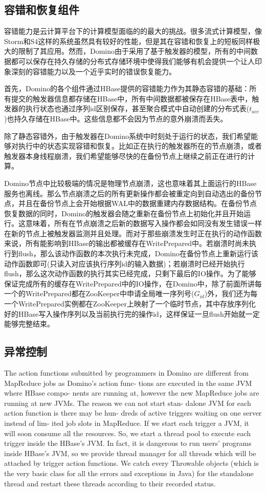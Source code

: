\subsection{容错和恢复组件}
容错能力是云计算平台下的计算模型面临的的最大的挑战。很多流式计算模型，像Storm和S4这样的系统虽然具有较好的性能，但是其在容错和恢复上的短板同样极大的限制了其应用。然而，Domino由于采用了基于触发器的模型，所有的中间数据都可以保存在持久存储的分布式存储环境中使得我们能够有机会提供一个让人印象深刻的容错能力以及一个近乎实时的错误恢复能力。

首先，Domino的各个组件通过HBase提供的容错能力作为其静态容错的基础：所有提交的触发器信息都存储在HBase中，所有中间数据都被保存在HBase表中，触发器的执行状态也通过序列id区别保存，甚至聚合模式中自动创建的分布式表($t_{acc}$)也持久存储在HBase中。这些信息都不会因为节点的意外崩溃而丢失。

除了静态容错外，由于触发器在Domino系统中时刻处于运行的状态，我们希望能够对执行中的状态实现容错和恢复。比如正在执行的触发器所在的节点崩溃，或者触发器本身线程崩溃，我们希望能够尽快的在备份节点上继续之前正在进行的计算。

Domino节点中比较极端的情况是物理节点崩溃，这也意味着其上面运行的HBase服务也离线。那么节点崩溃之后的所有更新操作都会被重定向到自动选出的备份节点，并且在备份节点上会开始根据WAL中的数据重建内存数据结构。在备份节点恢复数据的同时，Domino的触发器会随之重新在备份节点上初始化并且开始运行。这意味着，所有在节点崩溃之后新的数据写入操作都会如同没有发生错误一样在新的节点上被触发器监测并且处理。而对于那些崩溃发生时正在执行的动作函数来说，所有能影响到HBase的输出都被缓存在WritePrepared中。若崩溃时尚未执行到flush，那么该动作函数的本次执行未完成，Domino在备份节点上重新运行该动作函数即可(只读入对应该执行序列id的输入数据)；若崩溃时已经开始执行flush，那么这次动作函数的执行其实已经完成，只剩下最后的IO操作。为了能够保证完成所有的缓存在WritePrepared中的IO操作，在Domino中，除了前面所讲每一个的WritePrepared都在ZooKeeper中申请全局唯一序列号($G_{id}$)外，我们还为每一个WritePrepared实例都在ZooKeeper上映射了一个临时节点，其中存放序列化好的HBase写入操作序列以及当前执行完的操作id，这样保证一旦flush开始就一定能够完整结束。

\subsection{异常控制}
The action functions submitted by programmers in Domino are different from MapReduce jobs as Domino’s action func- tions are executed in the same JVM where HBase compo- nents are running at, however the new MapReduce jobs are running at new JVMs. The reason we can not start stan- dalone JVM for each action function is there may be hun- dreds of active triggers waiting on one server instead of lim- ited job slots in MapReduce. If we start each trigger a JVM, it will soon consume all the resources. So, we start a thread pool to execute each trigger inside the HBase’s JVM.
In fact, it is dangerous to run users’ programs inside HBase’s JVM, so we provide thread manager for all threads which will be attached by trigger action functions. We catch every Throwable objects (which is the very basic class for all the errors and exceptions in Java) for the standalone thread and restart these threads according to their recorded status.

